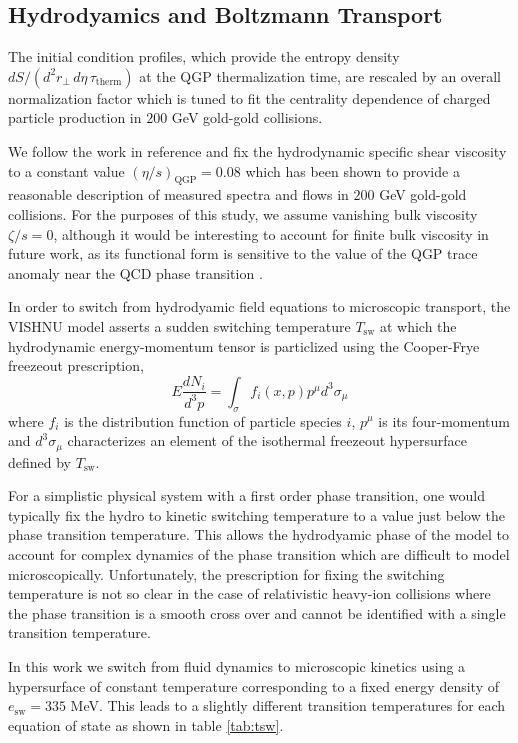 \documentclass[aps,prc,reprint,amsmath,nofootinbib,superscriptaddress]{revtex4-1}
\begin{document}
\subsection{Hydrodyamics and Boltzmann Transport}

The initial condition profiles, which provide the entropy density $dS/(d^2r_\perp\, d\eta\, \tau_\text{therm})$ at the QGP thermalization time, are rescaled
by an overall normalization factor which is tuned to fit the centrality dependence of charged particle production in $200$ GeV gold-gold collisions.

We follow the work in reference \cite{?} and fix the hydrodynamic specific shear viscosity to a constant value $(\eta/s)_\text{QGP}=0.08$ which has been shown to
provide a reasonable description of measured spectra and flows in $200$ GeV gold-gold collisions. For the purposes of this study, we assume vanishing bulk viscosity 
$\zeta/s=0$, although it would be interesting to account for finite bulk viscosity in future work, as its functional form is sensitive to the value of the QGP trace 
anomaly near the QCD phase transition \cite{?}.

In order to switch from hydrodyamic field equations to microscopic transport, the VISHNU model asserts a sudden switching temperature $T_\text{sw}$ at which the 
hydrodynamic energy-momentum tensor is particlized using the Cooper-Frye freezeout prescription,
\begin{equation}
 E\frac{dN_i}{d^3p} = \int_\sigma f_i(x,p) p^\mu d^3\sigma_\mu
 \label{cooper-frye}
\end{equation}
where $f_i$ is the distribution function of particle species $i$, $p^\mu$ is its four-momentum and $d^3\sigma_\mu$ characterizes an element of the isothermal 
freezeout hypersurface defined by $T_\text{sw}$.

For a simplistic physical system with a first order phase transition, one would typically fix the hydro to kinetic switching temperature to a value just below the phase 
transition temperature. This allows the hydrodyamic phase of the model to account for complex dynamics of the phase transition which are difficult to model 
microscopically. Unfortunately, the prescription for fixing the switching temperature is not so clear in the case of relativistic heavy-ion collisions where the 
phase transition is a smooth cross over and cannot be identified with a single transition temperature. 

In this work we switch from fluid dynamics to microscopic kinetics using a hypersurface of constant temperature corresponding to a fixed energy density of 
$e_\text{sw}= 335$ MeV. This leads to a slightly different transition temperatures for each equation of state as shown in table \ref{tab:tsw}.
\end{document}
